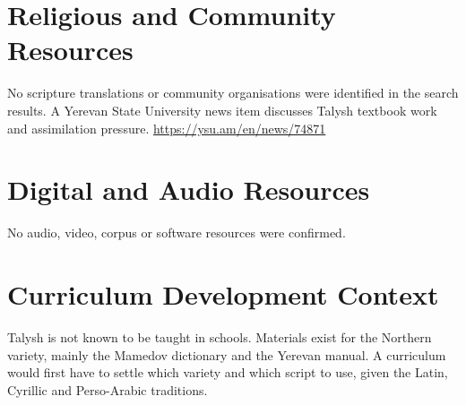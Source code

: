 \documentclass[12pt]{article}
\begin{document}
\section{Religious and Community Resources}
No scripture translations or community organisations were identified in the search results. A Yerevan State University news item discusses Talysh textbook work and assimilation pressure. \url{https://ysu.am/en/news/74871}

\section{Digital and Audio Resources}
No audio, video, corpus or software resources were confirmed.

\section{Curriculum Development Context}
Talysh is not known to be taught in schools. Materials exist for the Northern variety, mainly the Mamedov dictionary and the Yerevan manual. A curriculum would first have to settle which variety and which script to use, given the Latin, Cyrillic and Perso-Arabic traditions.
\end{document}
